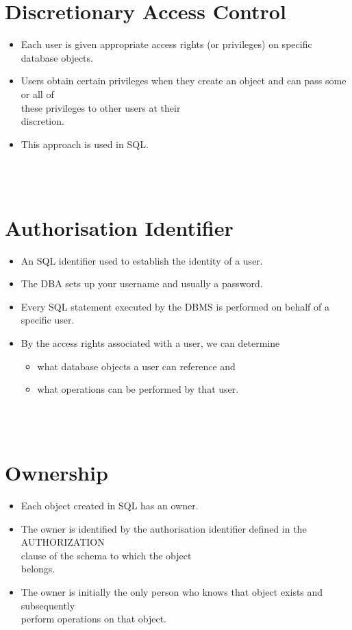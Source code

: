 \documentclass[12pt]{article}
\begin{document}
\section{Discretionary Access Control}
\begin{itemize}
  \item Each user is given appropriate access rights 
(or privileges) on specific database objects.\\
  \item Users obtain certain privileges when they 
create an object and can pass some or all of \\
these privileges to other users at their \\
discretion.\\
  \item This approach is used in SQL.
\end{itemize}
\\ 
 \\
\section{Authorisation Identifier}
\begin{itemize}
  \item An SQL identifier used to establish the identity 
of a user.\\
  \item The DBA sets up your username and usually a 
password.\\
  \item Every SQL statement executed by the DBMS is 
performed on behalf of a specific user.\\
  \item By the access rights associated with a user, we 
can determine \\
\begin{itemize}
  \item what database objects a user can reference and 
  \item what operations can be performed by that user.
\end{itemize}
\end{itemize}
\\ 
 \\
\section{Ownership}
\begin{itemize}
  \item Each object created in SQL has an owner.
  \item The owner is identified by the authorisation 
identifier defined in the AUTHORIZATION \\
clause of the schema to which the object \\
belongs.\\
  \item The owner is initially the only person who 
knows that object exists and subsequently \\
perform operations on that object.\\
\end{itemize}
\\ 
 \\
\end{document}

